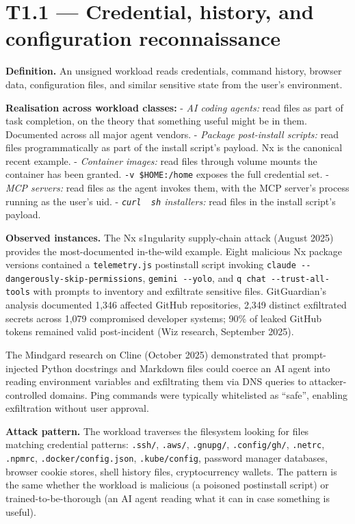 \hypertarget{t1.1-credential-history-and-configuration-reconnaissance}{%
\section{T1.1 --- Credential, history, and configuration
reconnaissance}\label{t1.1-credential-history-and-configuration-reconnaissance}}

\textbf{Definition.} An unsigned workload reads credentials, command
history, browser data, configuration files, and similar sensitive state
from the user's environment.

\textbf{Realisation across workload classes:} - \emph{AI coding agents:}
read files as part of task completion, on the theory that something
useful might be in them. Documented across all major agent vendors. -
\emph{Package post-install scripts:} read files programmatically as part
of the install script's payload. Nx is the canonical recent example. -
\emph{Container images:} read files through volume mounts the container
has been granted. \texttt{-v\ \$HOME:/home} exposes the full credential
set. - \emph{MCP servers:} read files as the agent invokes them, with
the MCP server's process running as the user's uid. -
\emph{\texttt{curl\ \textbar{}\ sh} installers:} read files in the
install script's payload.

\textbf{Observed instances.} The Nx s1ngularity supply-chain attack
(August 2025) provides the most-documented in-the-wild example. Eight
malicious Nx package versions contained a \texttt{telemetry.js}
postinstall script invoking
\texttt{claude\ -\/-dangerously-skip-permissions},
\texttt{gemini\ -\/-yolo}, and \texttt{q\ chat\ -\/-trust-all-tools}
with prompts to inventory and exfiltrate sensitive files. GitGuardian's
analysis documented 1,346 affected GitHub repositories, 2,349 distinct
exfiltrated secrets across 1,079 compromised developer systems; 90\% of
leaked GitHub tokens remained valid post-incident (Wiz research,
September 2025).

The Mindgard research on Cline (October 2025) demonstrated that
prompt-injected Python docstrings and Markdown files could coerce an AI
agent into reading environment variables and exfiltrating them via DNS
queries to attacker-controlled domains. Ping commands were typically
whitelisted as ``safe'', enabling exfiltration without user approval.

\textbf{Attack pattern.} The workload traverses the filesystem looking
for files matching credential patterns: \texttt{.ssh/}, \texttt{.aws/},
\texttt{.gnupg/}, \texttt{.config/gh/}, \texttt{.netrc},
\texttt{.npmrc}, \texttt{.docker/config.json}, \texttt{.kube/config},
password manager databases, browser cookie stores, shell history files,
cryptocurrency wallets. The pattern is the same whether the workload is
malicious (a poisoned postinstall script) or trained-to-be-thorough (an
AI agent reading what it can in case something is useful).

